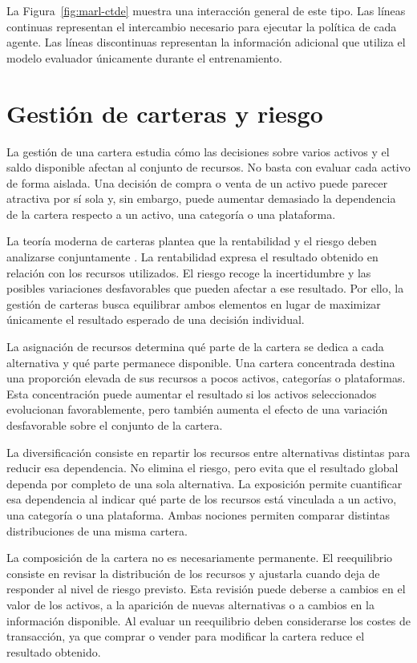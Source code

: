 La Figura~\ref{fig:marl-ctde} muestra una interacción general de este tipo. Las líneas continuas representan el intercambio necesario para ejecutar la política de cada agente. Las líneas discontinuas representan la información adicional que utiliza el modelo evaluador únicamente durante el entrenamiento.

\section{Gestión de carteras y riesgo}
\label{sec:estado-arte-carteras-riesgo}

La gestión de una cartera estudia cómo las decisiones sobre varios activos y el saldo disponible afectan al conjunto de recursos. No basta con evaluar cada activo de forma aislada. Una decisión de compra o venta de un activo puede parecer atractiva por sí sola y, sin embargo, puede aumentar demasiado la dependencia de la cartera respecto a un activo, una categoría o una plataforma.

La teoría moderna de carteras plantea que la rentabilidad y el riesgo deben analizarse conjuntamente \cite{markowitz1952portfolio}. La rentabilidad expresa el resultado obtenido en relación con los recursos utilizados. El riesgo recoge la incertidumbre y las posibles variaciones desfavorables que pueden afectar a ese resultado. Por ello, la gestión de carteras busca equilibrar ambos elementos en lugar de maximizar únicamente el resultado esperado de una decisión individual.

\clearpage

La asignación de recursos determina qué parte de la cartera se dedica a cada alternativa y qué parte permanece disponible. Una cartera concentrada destina una proporción elevada de sus recursos a pocos activos, categorías o plataformas. Esta concentración puede aumentar el resultado si los activos seleccionados evolucionan favorablemente, pero también aumenta el efecto de una variación desfavorable sobre el conjunto de la cartera.

La diversificación consiste en repartir los recursos entre alternativas distintas para reducir esa dependencia. No elimina el riesgo, pero evita que el resultado global dependa por completo de una sola alternativa. La exposición permite cuantificar esa dependencia al indicar qué parte de los recursos está vinculada a un activo, una categoría o una plataforma. Ambas nociones permiten comparar distintas distribuciones de una misma cartera.

La composición de la cartera no es necesariamente permanente. El reequilibrio consiste en revisar la distribución de los recursos y ajustarla cuando deja de responder al nivel de riesgo previsto. Esta revisión puede deberse a cambios en el valor de los activos, a la aparición de nuevas alternativas o a cambios en la información disponible. Al evaluar un reequilibrio deben considerarse los costes de transacción, ya que comprar o vender para modificar la cartera reduce el resultado obtenido.

